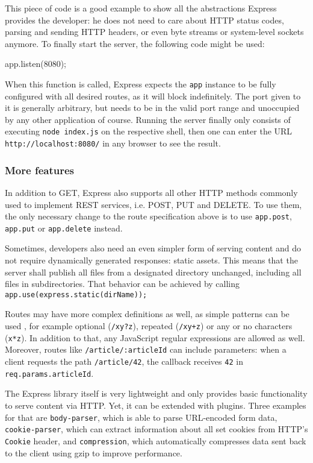 \documentclass{bioinfo}
\begin{document}
This piece of code is a good example to show all the abstractions Express provides the developer: he does not need to care about HTTP status codes, parsing and sending HTTP headers, or even byte streams or system-level sockets anymore. To finally start the server, the following code might be used:

\begin{verbatim*}
    app.listen(8080);
\end{verbatim*}

When this function is called, Express expects the \texttt{app} instance to be fully configured with all desired routes, as it will block indefinitely. The port given to it is generally arbitrary, but needs to be in the valid port range and unoccupied by any other application of course. Running the server finally only consists of executing \texttt{node index.js} on the respective shell, then one can enter the URL \texttt{http://localhost:8080/} in any browser to see the result.

\subsubsection{More features}

In addition to GET, Express also supports all other HTTP methods commonly used to implement REST services, i.e. POST, PUT and DELETE. To use them, the only necessary change to the route specification above is to use \texttt{app.post}, \texttt{app.put} or \texttt{app.delete} instead.

Sometimes, developers also need an even simpler form of serving content and do not require dynamically generated responses: static assets. This means that the server shall publish all files from a designated directory unchanged, including all files in subdirectories. That behavior can be achieved by calling \texttt{app.use(express.static(dirName));}

Routes may have more complex definitions as well, as simple patterns can be used \cite{expressrouting}, for example optional (\texttt{/xy?z}), repeated (\texttt{/xy+z}) or any or no characters (\texttt{x*z}). In addition to that, any JavaScript regular expressions are allowed as well. Moreover, routes like \texttt{/article/:articleId} can include parameters: when a client requests the path \texttt{/article/42}, the callback receives \texttt{42} in \texttt{req.params.articleId}.

The Express library itself is very lightweight and only provides basic functionality to serve content via HTTP. Yet, it can be extended with plugins. Three examples for that are \texttt{body-parser}, which is able to parse URL-encoded form data, \texttt{cookie-parser}, which can extract information about all set cookies from HTTP's \texttt{Cookie} header, and \texttt{compression}, which automatically compresses data sent back to the client using gzip to improve performance.
\end{document}
